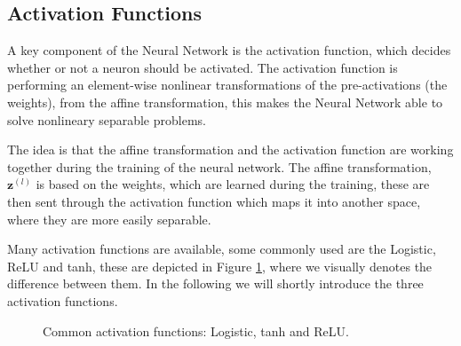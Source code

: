     \subsection{Activation Functions}\label{sec:NN_activation}
    A key component of the Neural Network is the activation function, which decides whether or not a neuron should be activated. The activation function is performing an element-wise nonlinear transformations of the pre-activations (the weights), from the affine transformation, this makes the Neural Network able to solve nonlineary separable problems. 
    
    The idea is that the affine transformation and the activation function are working together during the training of the neural network. The affine transformation, $\boldsymbol{z}^{(l)}$ is based on the weights, which are learned during the training, these are then sent through the activation function which maps it into another space, where they are more easily separable. 
    
    Many activation functions are available, some commonly used are the Logistic, ReLU and tanh, these are depicted in Figure \ref{fig:activations}, where we visually denotes the difference between them. In the following we will shortly introduce the three activation functions.

        \begin{figure}[t]
    \centering
    \caption{Common activation functions: Logistic, tanh and ReLU.\label{fig:activations}}
\end{figure}
